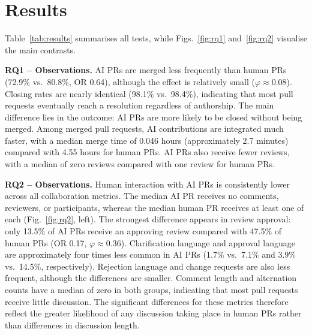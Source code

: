 \documentclass[conference]{IEEEtran}
\begin{document}
\section{Results}
Table~\ref{tab:results} summarises all tests, while Figs.~\ref{fig:rq1} and~\ref{fig:rq2} visualise the main contrasts.

\textbf{RQ1 -- Observations.} 
AI PRs are merged less frequently than human PRs (72.9\% vs.\ 80.8\%, OR 0.64), although the effect is relatively small ($\varphi \approx 0.08$). Closing rates are nearly identical (98.1\% vs.\ 98.4\%), indicating that most pull requests eventually reach a resolution regardless of authorship. The main difference lies in the outcome: AI PRs are more likely to be closed without being merged. Among merged pull requests, AI contributions are integrated much faster, with a median merge time of 0.046 hours (approximately 2.7 minutes) compared with 4.55 hours for human PRs. AI PRs also receive fewer reviews, with a median of zero reviews compared with one review for human PRs.

\textbf{RQ2 -- Observations.} 
Human interaction with AI PRs is consistently lower across all collaboration metrics. The median AI PR receives no comments, reviewers, or participants, whereas the median human PR receives at least one of each (Fig.~\ref{fig:rq2}, left). The strongest difference appears in review approval: only 13.5\% of AI PRs receive an approving review compared with 47.5\% of human PRs (OR 0.17, $\varphi \approx 0.36$). Clarification language and approval language are approximately four times less common in AI PRs (1.7\% vs.\ 7.1\% and 3.9\% vs.\ 14.5\%, respectively). Rejection language and change requests are also less frequent, although the differences are smaller. Comment length and alternation counts have a median of zero in both groups, indicating that most pull requests receive little discussion. The significant differences for these metrics therefore reflect the greater likelihood of any discussion taking place in human PRs rather than differences in discussion length.

\clearpage
\onecolumn
\end{document}

